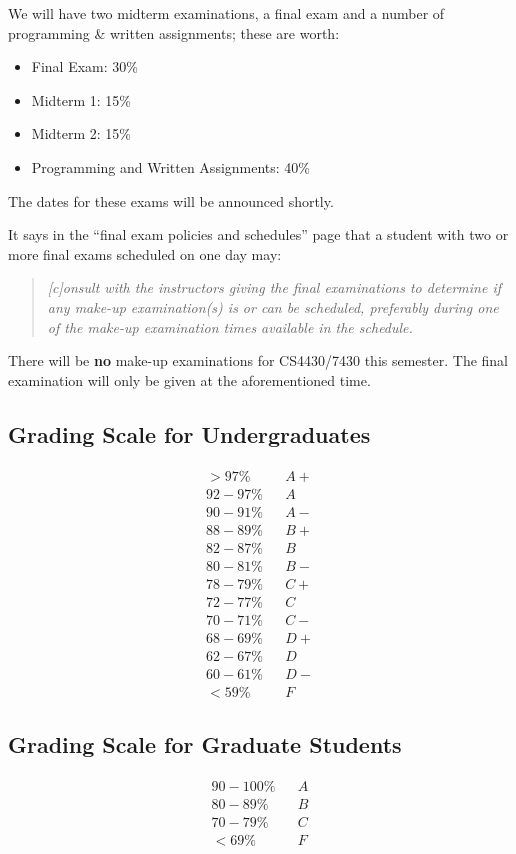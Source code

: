 \documentclass[11pt]{article}
\begin{document}
We will have two midterm examinations, a final exam and a number of programming \& written assignments; these are worth:
\begin{itemize}
\item Final Exam: 30\%
\item Midterm 1: 15\%
\item Midterm 2: 15\%
\item Programming and Written Assignments: 40\%
\end{itemize}
The dates for these exams will be announced shortly.

It says in the ``final exam policies and schedules'' page that a student with two or more final exams scheduled on one day may:
\begin{quote}
{\it [c]onsult with the instructors giving the final examinations to determine if any make-up examination(s) is or can be scheduled, preferably during one of the make-up examination times available in the schedule.}
\end{quote}
There will be {\bf no} make-up examinations for CS4430/7430 this semester. The final examination will only be given at the aforementioned time.


\subsection*{Grading Scale for Undergraduates}
\[
\begin{array}{lcl}
> 97\%	&&A+ \\
92-97\%	&&A \\
90-91\%	&&A- \\
88-89\%	&&B+ \\
82-87\%	&&B \\
80-81\%	&&B- \\
78-79\%	&&C+ \\
72-77\%	&&C \\
70-71\%	&&C- \\
68-69\%	&&D+ \\
62-67\%	&&D \\
60-61\%	&&D- \\
< 59\%	&&F
\end{array}
\]

\subsection*{Grading Scale for Graduate Students} 

\[
\begin{array}{lcl}
90-100\%	&&A\\
80-89\%	&&B\\
70-79\%	&&C\\
< 69\%	&&F
\end{array}
\]
\end{document}
